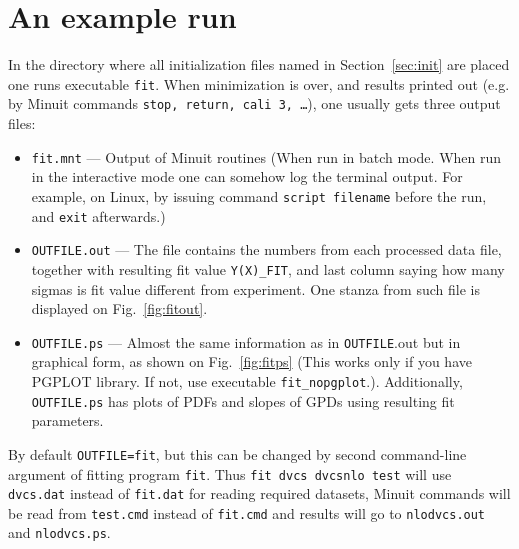 \documentclass[12pt]{article}
\begin{document}
\section{An example run}

In the directory where all initialization files named in Section~\ref{sec:init} are
placed one runs executable \texttt{fit}. When minimization is over, and results
printed out (e.g. by Minuit commands \texttt{stop, return, cali 3, \dots}), one 
usually gets three output files:
\begin{itemize}
\item \texttt{fit.mnt}  ---  Output of Minuit routines (When run in batch mode. When
run in the interactive mode one can somehow log the terminal output. For example,
on Linux, by issuing command \texttt{script filename} before the run, and
\texttt{exit} afterwards.)
\item \texttt{OUTFILE.out}   ---  
The file contains the numbers from each processed data file, together with
resulting fit value \texttt{Y(X)\_FIT},
and last column saying how many sigmas is fit value different from experiment.
One stanza from such file is displayed on Fig.~\ref{fig:fitout}.
\item \texttt{OUTFILE.ps}    ---  Almost the same information as 
in \texttt{OUTFILE}.out but in graphical form, as shown on
Fig.~\ref{fig:fitps}  (This works only if you have PGPLOT library. If not, use
executable \texttt{fit\_nopgplot}.). Additionally, \texttt{OUTFILE.ps} has plots
of PDFs and slopes of GPDs using resulting fit parameters.
\end{itemize}

By default \texttt{OUTFILE=fit}, but this can be changed by second command-line
argument of fitting program \texttt{fit}. Thus \texttt{fit  dvcs dvcsnlo test}
will use \texttt{dvcs.dat} instead of \texttt{fit.dat} for reading required
datasets, Minuit commands will be read from \texttt{test.cmd} instead of
\texttt{fit.cmd} and results will go to \texttt{nlodvcs.out} and \texttt{nlodvcs.ps}.
\end{document}
